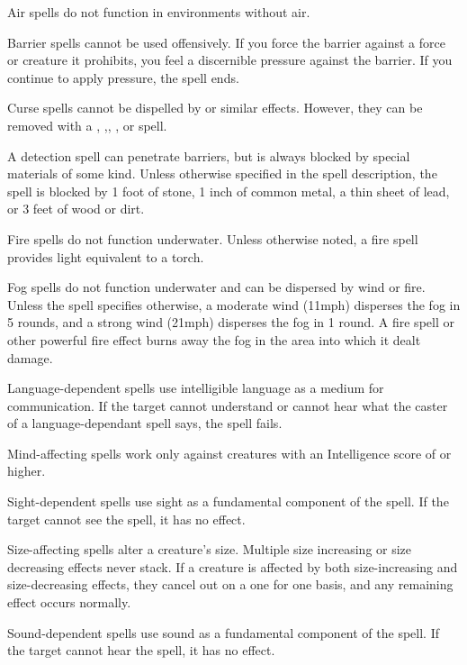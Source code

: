 \begin{itemize*}
\item Air spells do not function in environments without air.
\item Barrier spells cannot be used offensively. If you force the barrier against a force or creature it prohibits, you feel a discernible pressure against the barrier. If you continue to apply pressure, the spell ends.
\item Curse spells cannot be dispelled by  or similar effects. However, they can be removed with a , ,, , or  spell.
\item A detection spell can penetrate barriers, but is always blocked by special materials of some kind. Unless otherwise specified in the spell description, the spell is blocked by 1 foot of stone, 1 inch of common metal, a thin sheet of lead, or 3 feet of wood or dirt.
\item Fire spells do not function underwater. Unless otherwise noted, a fire spell provides light equivalent to a torch.
\item Fog spells do not function underwater and can be dispersed by wind or fire. Unless the spell specifies otherwise, a moderate wind (11\add mph) disperses the fog in 5 rounds, and a strong wind (21\add mph) disperses the fog in 1 round. A fire spell or other powerful fire effect burns away the fog in the area into which it dealt damage.
\item Language-dependent spells use intelligible language as a medium for communication. If the target cannot understand or cannot hear what the caster of a language-dependant spell says, the spell fails.
\item Mind-affecting spells work only against creatures with an Intelligence score of  or higher.
\item Sight-dependent spells use sight as a fundamental component of the spell. If the target cannot see the spell, it has no effect.
\item Size-affecting spells alter a creature's size. Multiple size increasing or size decreasing effects never stack. If a creature is affected by both size-increasing and size-decreasing effects, they cancel out on a one for one basis, and any remaining effect occurs normally.
\item Sound-dependent spells use sound as a fundamental component of the spell. If the target cannot hear the spell, it has no effect.

\end{itemize*}
